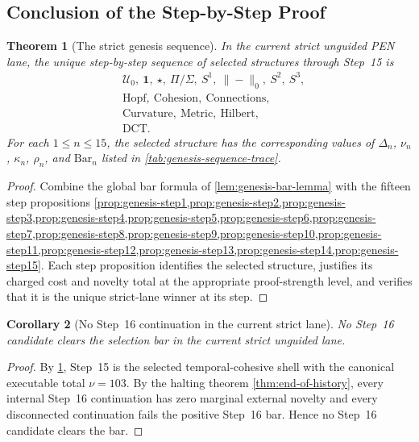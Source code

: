 \documentclass[11pt,a4paper]{article}
\theoremstyle{plain}
\newtheorem{theorem}{Theorem}[section]
\newtheorem{corollary}[theorem]{Corollary}
\theoremstyle{definition}
\theoremstyle{remark}
\newcommand{\U}{\mathcal{U}}
\begin{document}
\subsection{Conclusion of the Step-by-Step Proof}
\label{subsec:genesis-proof-conclusion}

\begin{theorem}[The strict genesis sequence]
\label{thm:strict-genesis-sequence}
In the current strict unguided PEN lane, the unique step-by-step sequence of
selected structures through Step~15 is
\[
  \begin{aligned}
    &\U_0,\ \mathbf{1},\ \star,\ \Pi/\Sigma,\ S^1,\ \|{-}\|_0,\ S^2,\ S^3,\\
    &\mathrm{Hopf},\ \mathrm{Cohesion},\ \mathrm{Connections},\\
    &\mathrm{Curvature},\ \mathrm{Metric},\ \mathrm{Hilbert},\\
    &\mathrm{DCT}.
  \end{aligned}
\]
For each $1\le n\le 15$, the selected structure has the corresponding values of
$\Delta_n$, $\nu_n$, $\kappa_n$, $\rho_n$, and $\mathrm{Bar}_n$ listed in
\cref{tab:genesis-sequence-trace}.
\end{theorem}

\begin{proof}
Combine the global bar formula of \cref{lem:genesis-bar-lemma} with the fifteen
step propositions
\cref{prop:genesis-step1,prop:genesis-step2,prop:genesis-step3,prop:genesis-step4,prop:genesis-step5,prop:genesis-step6,prop:genesis-step7,prop:genesis-step8,prop:genesis-step9,prop:genesis-step10,prop:genesis-step11,prop:genesis-step12,prop:genesis-step13,prop:genesis-step14,prop:genesis-step15}.
Each step proposition identifies the selected structure, justifies its charged
cost and novelty total at the appropriate proof-strength level, and verifies
that it is the unique strict-lane winner at its step.
\end{proof}

\begin{corollary}[No Step~16 continuation in the current strict lane]
\label{cor:genesis-no-step16}
No Step~16 candidate clears the selection bar in the current strict unguided
lane.
\end{corollary}

\begin{proof}
By \cref{thm:strict-genesis-sequence}, Step~15 is the selected temporal-cohesive
shell with the canonical executable total $\nu=103$.
By the halting theorem \cref{thm:end-of-history}, every internal Step~16
continuation has zero marginal external novelty and every disconnected
continuation fails the positive Step~16 bar.
Hence no Step~16 candidate clears the bar.
\end{proof}

\let\paragraph\genesissequenceorigparagraph

\ifgenesissequencestandalone
\end{document}
